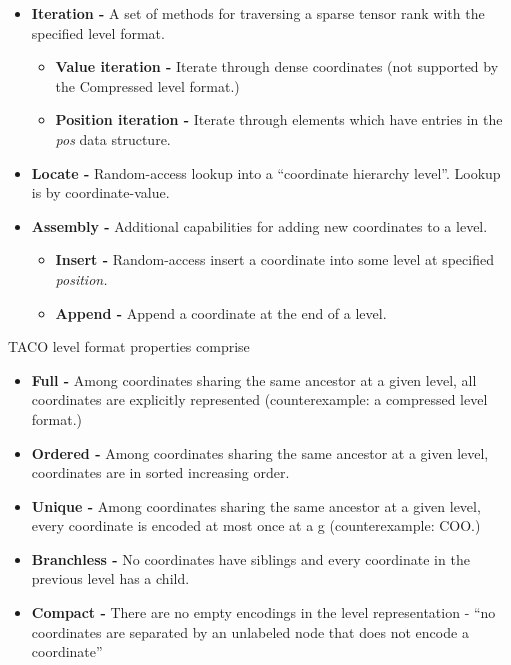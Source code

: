 \begin{itemize}
    \item \textbf{Iteration -} A set of methods for traversing a sparse tensor rank with the specified level format.
    \begin{itemize}
        \item \textbf{Value iteration -} Iterate through dense coordinates (not supported by the Compressed level format.)
        \item \textbf{Position iteration -} Iterate through elements which have entries in the \textit{pos} data structure.
    \end{itemize}
    \item \textbf{Locate -} Random-access lookup into a ``coordinate hierarchy level''. Lookup is by coordinate-value.
    \item \textbf{Assembly -} Additional capabilities for adding new coordinates to a level.
    \begin{itemize}
        \item \textbf{Insert -} Random-access insert a coordinate into some level at specified \textit{position.}
        \item \textbf{Append -} Append a coordinate at the end of a level.
    \end{itemize}
\end{itemize}

TACO level format properties comprise

\begin{itemize}
    \item \textbf{Full -} Among coordinates sharing the same ancestor at a given level, all coordinates are explicitly represented (counterexample: a compressed level format.)
    \item \textbf{Ordered -} Among coordinates sharing the same ancestor at a given level, coordinates are in sorted increasing order.
    \item \textbf{Unique -} Among coordinates sharing the same ancestor at a given level, every coordinate is encoded at most once at a g (counterexample: COO.)
    \item \textbf{Branchless -} No coordinates have siblings and every coordinate in the previous level has a child.
    \item \textbf{Compact -} There are no empty encodings in the level representation - ``no coordinates are separated by an unlabeled node that does not encode a coordinate''
\end{itemize}

